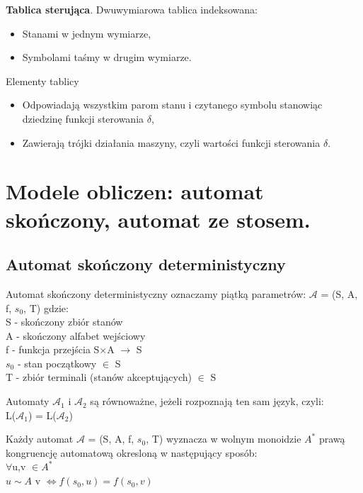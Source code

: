 \documentclass[12pt]{article}
\begin{document}
    \begin{definition}
        \textbf{Tablica sterująca}. Dwuwymiarowa tablica indeksowana:
        \begin{itemize}
            \item Stanami w jednym wymiarze,
            \item Symbolami taśmy w drugim wymiarze.
        \end{itemize}
        Elementy tablicy
        \begin{itemize}
            \item Odpowiadają wszystkim parom stanu i czytanego symbolu stanowiąc dziedzinę
            funkcji sterowania $\delta$,
            \item Zawierają trójki działania maszyny, czyli wartości funkcji sterowania $\delta$.
        \end{itemize}
    \end{definition}

    \newpage

    \section{Modele obliczen: automat skończony, automat ze stosem.}
    \subsection{Automat skończony deterministyczny}
    \begin{definition}
    		Automat skończony deterministyczny oznaczamy piątką parametrów: $\mathcal{A}$ = (S, A, f, $s_{0}$, T) gdzie: \\
    			S - skończony zbiór stanów \\
    			A - skończony alfabet wejściowy \\
    			f - funkcja przejścia S$\times$A $\rightarrow$ S \\
    			$s_{0}$ - stan początkowy $\in$ S\\
    			T - zbiór terminali (stanów akceptujących) $\in$ S
    \end{definition}

    	\begin{definition}
    	Automaty $\mathcal{A}_{1}$ i  $\mathcal{A}_{2}$ są równoważne,  jeżeli rozpoznają ten sam język, czyli: \\
    	L($\mathcal{A}_{1}$) = L($\mathcal{A}_{2}$)
    	\end{definition}

    	\begin{definition}
    	Każdy automat $\mathcal{A}$ = (S, A, f, $s_{0}$, T) wyznacza w wolnym monoidzie $A^{*}$ prawą kongruencję automatową okresloną w następujący sposób: \\
    	$\forall$u,v $\in A^{*}$ \\
    $u \sim A$ v $\Leftrightarrow f(s_{0}, u) = f(s_{0}, v)$
    	\end{definition}
\end{document}
